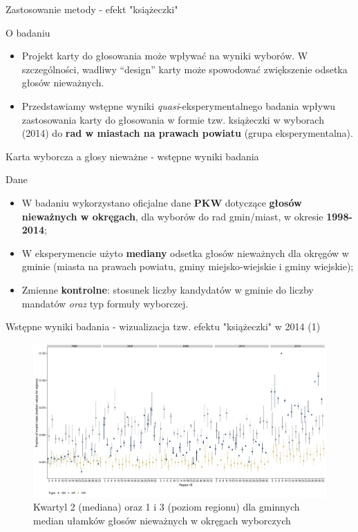 \documentclass[12pt]{beamer}
\begin{document}
\begin{frame}{Zastosowanie metody - efekt "książeczki"}

\begin{block}{O badaniu}
\begin{itemize}
\item Projekt karty do głosowania może wpływać na wyniki wyborów. W szczególności, wadliwy ``design'' karty może spowodować zwiększenie odsetka głosów nieważnych.
\item Przedstawiamy wstępne wyniki \textit{quasi}-eksperymentalnego badania wpływu zastosowania karty do głosowania w formie tzw. książeczki w wyborach (2014) do \textbf{rad w miastach na prawach powiatu} (grupa eksperymentalna).
\end{itemize}
\end{block}

\end{frame}

\begin{frame}{Karta wyborcza a głosy nieważne - wstępne wyniki badania}
    
\begin{block}{Dane}
\begin{itemize}
\item W badaniu wykorzystano oficjalne dane \textbf{PKW} dotyczące \textbf{głosów nieważnych w okręgach}, dla wyborów do rad gmin/miast, w okresie \textbf{1998-2014};
\item W eksperymencie użyto \textbf{mediany} odsetka głosów nieważnych dla okręgów w gminie (miasta na prawach powiatu, gminy miejsko-wiejskie i gminy wiejskie);
\item Zmienne \textbf{kontrolne}: stosunek liczby kandydatów w gminie do liczby mandatów \textit{oraz} typ formuły wyborczej.
\end{itemize}
\end{block}
    
\end{frame}

\begin{frame}{Wstępne wyniki badania - wizualizacja tzw. efektu "książeczki" w 2014 (1)}
    
\begin{figure}
\includegraphics[scale=0.22]{inv_medians.pdf}
\caption{\label{fig:did}Kwartyl 2 (mediana) oraz 1 i 3 (poziom regionu) dla gminnych median ułamków głosów nieważnych w okręgach wyborczych}
\end{figure}
    
\end{frame}
\end{document}
